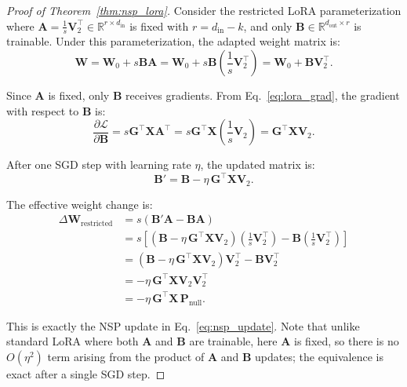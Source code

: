 \documentclass{article}
\begin{document}
\begin{proof}[Proof of Theorem~\ref{thm:nsp_lora}]
Consider the restricted LoRA parameterization where $\mathbf{A} = \frac{1}{s}\mathbf{V}_2^\top \in \mathbb{R}^{r \times d_{\text{in}}}$ is fixed with $r = d_{\text{in}} - k$, and only $\mathbf{B} \in \mathbb{R}^{d_{\text{out}} \times r}$ is trainable. Under this parameterization, the adapted weight matrix is:
\begin{equation}
    \mathbf{W} = \mathbf{W}_0 + s\mathbf{B}\mathbf{A} = \mathbf{W}_0 + s\mathbf{B} \left(\frac{1}{s}\mathbf{V}_2^\top\right) = \mathbf{W}_0 + \mathbf{B}\mathbf{V}_2^\top.
\end{equation}

Since $\mathbf{A}$ is fixed, only $\mathbf{B}$ receives gradients. From Eq.~\eqref{eq:lora_grad}, the gradient with respect to $\mathbf{B}$ is:
\begin{equation}
    \frac{\partial \mathcal{L}}{\partial \mathbf{B}} = s\mathbf{G}^\top \mathbf{X} \mathbf{A}^\top = s\mathbf{G}^\top \mathbf{X} \left(\frac{1}{s}\mathbf{V}_2\right) = \mathbf{G}^\top \mathbf{X} \mathbf{V}_2.
\end{equation}

After one SGD step with learning rate $\eta$, the updated matrix is:
\begin{equation}
    \mathbf{B}' = \mathbf{B} - \eta \, \mathbf{G}^\top \mathbf{X} \mathbf{V}_2.
\end{equation}

The effective weight change is:
\begin{align}
    \Delta \mathbf{W}_{\text{restricted}}
    &= s(\mathbf{B}'\mathbf{A} - \mathbf{B}\mathbf{A}) \\
    &= s\left[\left(\mathbf{B} - \eta \, \mathbf{G}^\top \mathbf{X} \mathbf{V}_2\right)\left(\frac{1}{s}\mathbf{V}_2^\top\right) - \mathbf{B}\left(\frac{1}{s}\mathbf{V}_2^\top\right)\right] \\
    &= \left(\mathbf{B} - \eta \, \mathbf{G}^\top \mathbf{X} \mathbf{V}_2\right)\mathbf{V}_2^\top - \mathbf{B}\mathbf{V}_2^\top \\
    &= -\eta \, \mathbf{G}^\top \mathbf{X} \mathbf{V}_2 \mathbf{V}_2^\top \\
    &= -\eta \, \mathbf{G}^\top \mathbf{X} \, \mathbf{P}_{\text{null}}.
\end{align}

This is exactly the NSP update in Eq.~\eqref{eq:nsp_update}. Note that unlike standard LoRA where both $\mathbf{A}$ and $\mathbf{B}$ are trainable, here $\mathbf{A}$ is fixed, so there is no $O(\eta^2)$ term arising from the product of $\mathbf{A}$ and $\mathbf{B}$ updates; the equivalence is exact after a single SGD step.
\end{proof}
\end{document}
